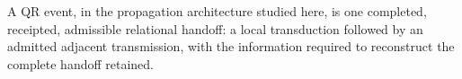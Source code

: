 \setcounter{theorem}{0}
\begin{definition}
A QR event, in the propagation architecture studied here, is one completed, receipted, admissible relational handoff: a local transduction followed by an admitted adjacent transmission, with the information required to reconstruct the complete handoff retained.
\end{definition}
